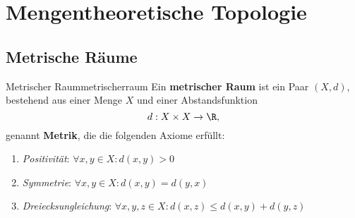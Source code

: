 \section{Mengentheoretische Topologie}
\label{PST}
\subsection{Metrische Räume}
\label{subsec:metrischeraeume}

\begin{definition}{Metrischer Raum}{metrischerraum}
Ein \textbf{metrischer Raum} ist ein Paar $(X, d)$, bestehend aus einer Menge $X$ und einer Abstandsfunktion \begin{equation}
d: X \times X \to \R,
\end{equation}
genannt \textbf{Metrik}, die die folgenden Axiome erfüllt:
\begin{enumerate}[({M}1)]
\item \textit{Positivität}: $\forall x,y \in X: d(x,y)>0$
\item \textit{Symmetrie}: $\forall x,y \in X: d(x,y)=d(y,x)$
\item \textit{Dreiecksungleichung}: $\forall x,y,z \in X: d(x,z) \leq d(x,y) + d(y,z)$
\end{enumerate}
\end{definition}

